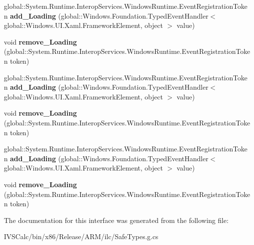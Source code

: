 \begin{DoxyCompactItemize}
\item 
\mbox{\label{interface_windows_1_1_u_i_1_1_xaml_1_1_i_framework_element3_af1a57f9e8b7276ac201c72be700eef28}} 
global\+::\+System.\+Runtime.\+Interop\+Services.\+Windows\+Runtime.\+Event\+Registration\+Token {\bfseries add\+\_\+\+Loading} (global\+::\+Windows.\+Foundation.\+Typed\+Event\+Handler$<$ global\+::\+Windows.\+U\+I.\+Xaml.\+Framework\+Element, object $>$ value)
\item 
\mbox{\label{interface_windows_1_1_u_i_1_1_xaml_1_1_i_framework_element3_a9fd463d247df0972531c7db2244e6f70}} 
void {\bfseries remove\+\_\+\+Loading} (global\+::\+System.\+Runtime.\+Interop\+Services.\+Windows\+Runtime.\+Event\+Registration\+Token token)
\item 
\mbox{\label{interface_windows_1_1_u_i_1_1_xaml_1_1_i_framework_element3_af1a57f9e8b7276ac201c72be700eef28}} 
global\+::\+System.\+Runtime.\+Interop\+Services.\+Windows\+Runtime.\+Event\+Registration\+Token {\bfseries add\+\_\+\+Loading} (global\+::\+Windows.\+Foundation.\+Typed\+Event\+Handler$<$ global\+::\+Windows.\+U\+I.\+Xaml.\+Framework\+Element, object $>$ value)
\item 
\mbox{\label{interface_windows_1_1_u_i_1_1_xaml_1_1_i_framework_element3_a9fd463d247df0972531c7db2244e6f70}} 
void {\bfseries remove\+\_\+\+Loading} (global\+::\+System.\+Runtime.\+Interop\+Services.\+Windows\+Runtime.\+Event\+Registration\+Token token)
\item 
\mbox{\label{interface_windows_1_1_u_i_1_1_xaml_1_1_i_framework_element3_af1a57f9e8b7276ac201c72be700eef28}} 
global\+::\+System.\+Runtime.\+Interop\+Services.\+Windows\+Runtime.\+Event\+Registration\+Token {\bfseries add\+\_\+\+Loading} (global\+::\+Windows.\+Foundation.\+Typed\+Event\+Handler$<$ global\+::\+Windows.\+U\+I.\+Xaml.\+Framework\+Element, object $>$ value)
\item 
\mbox{\label{interface_windows_1_1_u_i_1_1_xaml_1_1_i_framework_element3_a9fd463d247df0972531c7db2244e6f70}} 
void {\bfseries remove\+\_\+\+Loading} (global\+::\+System.\+Runtime.\+Interop\+Services.\+Windows\+Runtime.\+Event\+Registration\+Token token)
\end{DoxyCompactItemize}


The documentation for this interface was generated from the following file\+:\begin{DoxyCompactItemize}
\item 
I\+V\+S\+Calc/bin/x86/\+Release/\+A\+R\+M/ilc/Safe\+Types.\+g.\+cs\end{DoxyCompactItemize}
